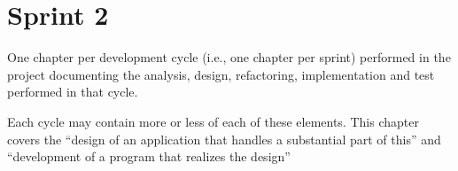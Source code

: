 \chapter{Sprint 2}

One chapter per development cycle (i.e., one chapter per sprint) performed in the project documenting the analysis, design, refactoring, implementation and test performed in that cycle.

Each cycle may contain more or less of each of these elements.
This chapter covers the “design of an application that handles a substantial part of this” and “development of a program that realizes the design”
